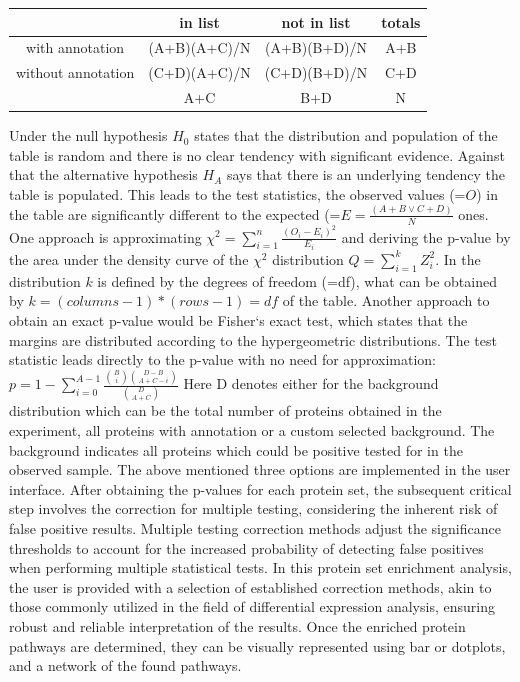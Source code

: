 \documentclass[
  11pt,
]{article}
\begin{document}
\begin{center}
\begin{tabular}{|c|| c| c|| c|} 
 \hline
   & in list & not in list & totals \\ [0.5ex] 
 \hline\hline
 with annotation & (A+B)(A+C)/N  & (A+B)(B+D)/N & A+B \\ 
 \hline
 without annotation & (C+D)(A+C)/N & (C+D)(B+D)/N & C+D \\
 \hline
  & A+C & B+D & N \\
 \hline
\end{tabular}
\end{center}

Under the null hypothesis \(H_{0}\) states that the distribution and population of the table is random and there is no clear tendency with significant evidence. Against that the alternative hypothesis \(H_{A}\) says that there is an underlying tendency the table is populated.
This leads to the test statistics, the observed values (=\(O\)) in the table are significantly different to the expected (=\(E=\frac{(A+B \lor C+D)}{N}\) ones. One approach is approximating \(\chi^2= \sum_{i=1}^{n} \frac{(O_i - E_i)^2}{E_i}\) and deriving the p-value by the area under the density curve of the \(\chi^2\) distribution \(Q = \sum_{i=1}^{k} Z_{i}^{2}\). In the distribution \(k\) is defined by the degrees of freedom (=df), what can be obtained by \(k=(columns-1)*(rows-1)=df\) of the table. Another approach to obtain an exact p-value would be Fisher`s exact test, which states that the margins are distributed according to the hypergeometric distributions. The test statistic leads directly to the p-value with no need for approximation:
\(p=1-\sum_{i=0}^{A-1}\frac{\binom{B}{i}\binom{D-B}{A+C-i}}{\binom{D}{A+C}}\)
Here D denotes either for the background distribution which can be the total number of proteins obtained in the experiment, all proteins with annotation or a custom selected background. The background indicates all proteins which could be positive tested for in the observed sample. The above mentioned three options are implemented in the user interface.
After obtaining the p-values for each protein set, the subsequent critical step involves the correction for multiple testing, considering the inherent risk of false positive results. Multiple testing correction methods adjust the significance thresholds to account for the increased probability of detecting false positives when performing multiple statistical tests. In this protein set enrichment analysis, the user is provided with a selection of established correction methods, akin to those commonly utilized in the field of differential expression analysis, ensuring robust and reliable interpretation of the results.
Once the enriched protein pathways are determined, they can be visually represented using bar or dotplots, and a network of the found pathways.
\end{document}

